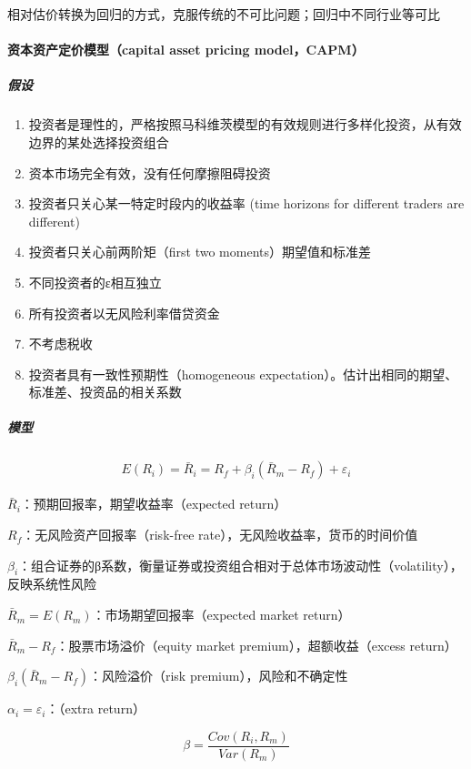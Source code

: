 \documentclass[12pt]{book}
\begin{document}
相对估价转换为回归的方式，克服传统的不可比问题；回归中不同行业等可比

\paragraph{资本资产定价模型（capital asset pricing model，CAPM）}


\subparagraph{假设}	

\begin{enumerate}[(1)]
  \item 投资者是理性的，严格按照马科维茨模型的有效规则进行多样化投资，从有效边界的某处选择投资组合
  \item 资本市场完全有效，没有任何摩擦阻碍投资
  \item 投资者只关心某一特定时段内的收益率 (time horizons for different traders are different)
  \item 投资者只关心前两阶矩（first two moments）期望值和标准差
  \item 不同投资者的ε相互独立
  \item 所有投资者以无风险利率借贷资金
  \item 不考虑税收
  \item 投资者具有一致性预期性（homogeneous expectation）。估计出相同的期望、标准差、投资品的相关系数
\end{enumerate}	

\subparagraph{模型}

\begin{gather*}
  E(R_i) = \bar{R}_i = R_f+\beta_i (\bar{R}_m-R_f )+\varepsilon_i
\end{gather*}
\par $\bar{R}_i$：预期回报率，期望收益率（expected return）
\par $R_f$：无风险资产回报率（risk-free rate），无风险收益率，货币的时间价值
\par $\beta_i$：组合证券的β系数，衡量证券或投资组合相对于总体市场波动性（volatility），反映系统性风险
\par $\bar{R}_m=E(R_m )$：市场期望回报率（expected market return）
\par $\bar{R}_m-R_f$：股票市场溢价（equity market premium），超额收益（excess return）
\par $\beta_i (\bar{R}_m-R_f )$：风险溢价（risk premium），风险和不确定性
\par $\alpha_i=\varepsilon_i$：（extra return）

$$ \beta = \frac{Cov(R_i,R_m )}{Var(R_m)}  $$
\end{document}
